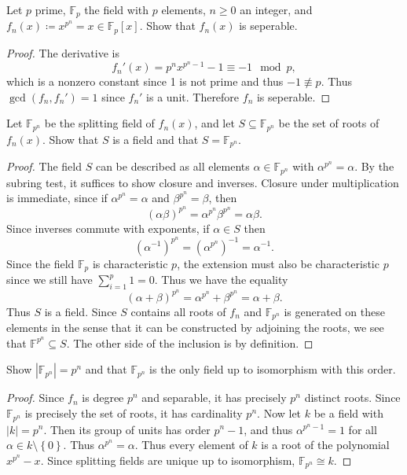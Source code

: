 \documentclass[11pt, letterpaper]{article}
\begin{document}
\begin{problem}
	Let $p$ prime, $\mathbb{F} _p$ the field with $p$ elements, $n\geq 0$ an integer, and $f_n(x)\coloneqq x^{p^n} =x\in\mathbb{F} _p[x]$. Show that $f_n(x)$ is seperable.
\end{problem}
\begin{proof}
	The derivative is
	\[
		f_n'(x)=p^n x^{p^n-1} -1 \equiv -1\mod{p},
	\]
	which is a nonzero constant since 1 is not prime and thus $-1\not\equiv p$. Thus $\operatorname{gcd} (f_n,f_n')=1$ since $f_n'$ is a unit. Therefore $f_n$ is seperable.
\end{proof}
\begin{problem}
	Let $\mathbb{F} _{p^n} $ be the splitting field of $f_n(x)$, and let $S\subseteq \mathbb{F} _{p^n} $ be the set of roots of $f_n(x)$. Show that $S$ is a field and that $S=\mathbb{F} _{p^n} $.
\end{problem}
\begin{proof}
	The field $S$ can be described as all elements $\alpha \in \mathbb{F} _{p^n} $ with $\alpha ^{p^n} =\alpha $. By the subring test, it suffices to show closure and inverses. Closure under multiplication is immediate, since if $\alpha ^{p^n} =\alpha $ and $\beta ^{p^n} =\beta $, then 
	\[
		\left( \alpha \beta  \right) ^{p^n} =\alpha ^{p^n} \beta ^{p^n} =\alpha \beta 
	.\]
	Since inverses commute with exponents, if $\alpha \in S$ then
	\[
		\left( \alpha ^{-1}  \right)^{p^n} =\left( \alpha ^{p^n}  \right) ^{-1} =\alpha ^{-1} 
	.\]
	Since the field $\mathbb{F} _p$ is characteristic $p$, the extension must also be characteristic $p$ since we still have $\sum_{i=1} ^p1=0$. Thus we have the equality
	\[
		\left( \alpha +\beta  \right) ^{p^n} =\alpha ^{p^n} +\beta ^{p^n} =\alpha+\beta 
	.\]
	Thus $S $ is a field. Since $S$ contains all roots of $f_n$ and $\mathbb{F} _{p^n} $ is generated on these elements in the sense that it can be constructed by adjoining the roots, we see that $\mathbb{F} ^{p^n} \subseteq S$. The other side of the inclusion is by definition.
\end{proof}
\begin{problem}
	Show $\left| \mathbb{F} _{p^n}  \right| =p^n$ and that $\mathbb{F} _{p^n} $ is the only field up to isomorphism with this order.
\end{problem}
\begin{proof}
	Since $f_n$ is degree $p^n$ and separable, it has precisely $p^n$ distinct roots. Since $\mathbb{F} _{p^n} $ is precisely the set of roots, it has cardinality $p^n$. Now let $k$ be a field with $\left| k \right| =p^n$. Then its group of units has order $p^n-1$, and thus $\alpha ^{p^n-1} =1$ for all $\alpha \in k\setminus \left\{ 0 \right\} $. Thus $\alpha ^{p^n} =\alpha $. Thus every element of $k$ is a root of the polynomial $x^{p^n} -x$. Since splitting fields are unique up to isomorphism, $\mathbb{F} _{p^n} \cong k$.
\end{proof}
\end{document}
